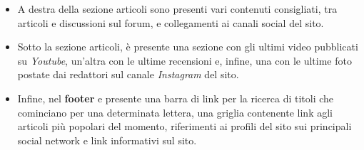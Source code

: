 \documentclass[12pt, a4paper,titlepage]{article}
\begin{document}
\begin{itemize}
    \item A destra della sezione articoli sono presenti vari contenuti consigliati, tra articoli e discussioni sul forum, e collegamenti ai canali social del sito.
    \item Sotto la sezione articoli, è presente una sezione con gli ultimi video pubblicati su \emph{Youtube}, un'altra con le ultime recensioni e, infine, una con le ultime foto postate dai redattori sul canale \emph{Instagram} del sito.
    \item Infine, nel \textbf{footer} e presente una barra di link per la ricerca di titoli che cominciano per una determinata lettera, una griglia contenente link agli articoli più popolari del momento, riferimenti ai profili del sito sui principali social network e link informativi sul sito.
\end{itemize}
\end{document}

